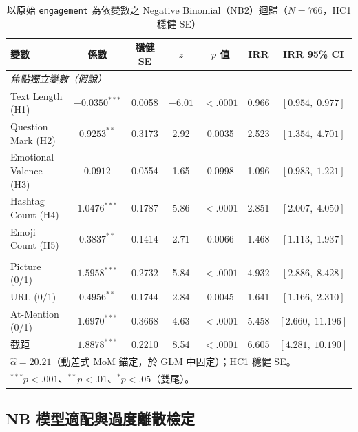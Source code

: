 \documentclass[12pt,a4paper]{ctexart}
\begin{document}
\begin{table}[H]
\centering
\caption{以原始 \texttt{engagement} 為依變數之 Negative Binomial（NB2）迴歸（$N=766$，HC1 穩健 SE）}
\label{tab:nb_main}
\small
\begin{tabular}{lcccccc}
\toprule
變數 & 係數 & 穩健 SE & $z$ & $p$ 值 & IRR & IRR 95\% CI \\
\midrule
\multicolumn{7}{l}{\textit{焦點獨立變數（假說）}} \\
Text Length (H1) & $-0.0350^{***}$ & 0.0058 & $-6.01$ & $<.0001$ & 0.966 & $[0.954,\;0.977]$ \\
Question Mark (H2) & $0.9253^{**}$ & 0.3173 & 2.92 & 0.0035 & 2.523 & $[1.354,\;4.701]$ \\
Emotional Valence (H3) & $0.0912$ & 0.0554 & 1.65 & 0.0998 & 1.096 & $[0.983,\;1.221]$ \\
Hashtag Count (H4) & $1.0476^{***}$ & 0.1787 & 5.86 & $<.0001$ & 2.851 & $[2.007,\;4.050]$ \\
Emoji Count (H5) & $0.3837^{**}$ & 0.1414 & 2.71 & 0.0066 & 1.468 & $[1.113,\;1.937]$ \\
\addlinespace
\multicolumn{7}{l}{\textit{控制變數（0/1 虛擬編碼）}} \\
Picture (0/1) & $1.5958^{***}$ & 0.2732 & 5.84 & $<.0001$ & 4.932 & $[2.886,\;8.428]$ \\
URL (0/1) & $0.4956^{**}$ & 0.1744 & 2.84 & 0.0045 & 1.641 & $[1.166,\;2.310]$ \\
At-Mention (0/1) & $1.6970^{***}$ & 0.3668 & 4.63 & $<.0001$ & 5.458 & $[2.660,\;11.196]$ \\
\addlinespace
截距 & $1.8878^{***}$ & 0.2210 & 8.54 & $<.0001$ & 6.605 & $[4.281,\;10.190]$ \\
\bottomrule
\multicolumn{7}{l}{\small $\hat\alpha = 20.21$（動差式 MoM 錨定，於 GLM 中固定）；HC1 穩健 SE。} \\
\multicolumn{7}{l}{\small $^{***}p<.001$、$^{**}p<.01$、$^{*}p<.05$（雙尾）。} \\
\end{tabular}
\end{table}

\subsection{NB 模型適配與過度離散檢定}
\end{document}

